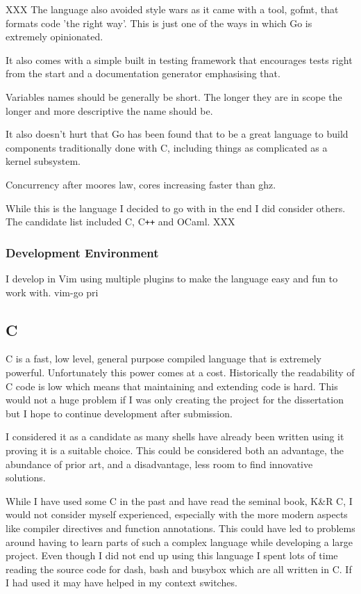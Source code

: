 XXX
The language also avoided style wars as it came with a tool, gofmt, that formats code 'the right way'.
This is just one of the ways in which Go is extremely opinionated.

It also comes with a simple built in testing framework that encourages tests right from the start and a documentation generator emphasising that.

Variables names should be generally be short. The longer they are in scope the longer and more descriptive the name should be.

It also doesn't hurt that Go has been found that to be a great language to build components traditionally done with C, including things as complicated as a kernel subsystem\cite{GONET}.

Concurrency after moores law, cores increasing faster than ghz.

While this is the language I decided to go with in the end I did consider others.
The candidate list included C, C\verb!++! and OCaml.
XXX

\subsubsection{Development Environment}
I develop in Vim using multiple plugins to make the language easy and fun to work with.
vim-go pri


\subsection{C}
C is a fast, low level, general purpose compiled language that is extremely powerful.
Unfortunately this power comes at a cost.
Historically the readability of C code is low which means that maintaining and extending code is hard.
This would not a huge problem if I was only creating the project for the dissertation but I hope to continue development after submission.

I considered it as a candidate as many shells have already been written using it proving it is a suitable choice.
This could be considered both an advantage, the abundance of prior art, and a disadvantage, less room to find innovative solutions.

While I have used some C in the past and have read the seminal book, K\&R C, I would not consider myself experienced, especially with the more modern aspects like compiler directives and function annotations.
This could have led to problems around having to learn parts of such a complex language while developing a large project.
Even though I did not end up using this language I spent lots of time reading the source code for dash, bash and busybox which are all written in C.
If I had used it may have helped in my context switches. 

